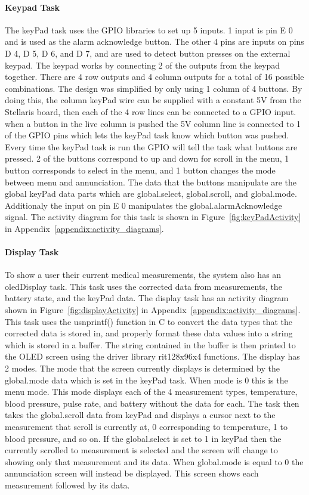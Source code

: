 \documentclass[12pt]{article} %
\begin{document}
    
    \paragraph{Keypad Task} The keyPad task uses the GPIO libraries to set up 5
    inputs. 1 input is pin E 0 and is used as the alarm acknowledge button. The
    other 4 pins are inputs on pins D 4, D 5, D 6, and D 7, and are used to
    detect button presses on the external keypad. The keypad works by
    connecting 2 of the outputs from the keypad together. There are 4 row
    outputs and 4 column outputs for a total of 16 possible combinations. The
    design was simplified by only using 1 column of 4 buttons. By doing this,
    the column keyPad wire can be supplied with a constant 5V from the
    Stellaris board, then each of the 4 row lines can be connected to a GPIO
    input. when a button in the live column is pushed the 5V column line is
    connected to 1 of the GPIO pins which lets the keyPad task know which
    button was pushed. Every time the keyPad task is run the GPIO will tell the
    task what buttons are pressed. 2 of the buttons correspond to up and down
    for scroll in the menu, 1 button corresponds to select in the menu, and 1
    button changes the mode between menu and annunciation. The data that the
    buttons manipulate are the global keyPad data parts which are
    global.select, global.scroll, and global.mode. Additionaly the input on pin
    E 0 manipulates the global.alarmAcknowledge signal. The activity diagram
    for this task is shown in Figure~\ref{fig:keyPadActivity} in Appendix~\ref{appendix:activity_diagrams}.

    \paragraph{Display Task} To show a user their current medical measurements,
    the system also has an oledDisplay task. This task uses the corrected data
    from measurements, the battery state, and the keyPad data. The display task
		has an activity diagram shown in Figure~\ref{fig:displayActivity} in
		Appendix~\ref{appendix:activity_diagrams}. This task uses the usnprintf() function
		in C to convert the data types that the corrected data is stored in, and
		properly format these data values into a string which is stored in a
		buffer. The string contained in the buffer is then printed to the OLED
		screen using the driver library rit128x96x4 functions. The display has 2
		modes. The mode that the screen currently displays is determined by the
		global.mode data which is set in the keyPad task. When mode is 0 this is
		the menu mode. This mode displays each of the 4 measurement types,
		temperature, blood pressure, pulse rate, and battery without the data for
		each. The task then takes the global.scroll data from keyPad and displays a
		cursor next to the measurement that scroll is currently at, 0 corresponding
		to temperature, 1 to blood pressure, and so on. If the global.select is set
		to 1 in keyPad then the currently scrolled to measurement is selected and
		the screen will change to showing only that measurement and its data. When
		global.mode is equal to 0 the annunciation screen will instead be
		displayed. This screen shows each measurement followed by its data.
    
\end{document}
